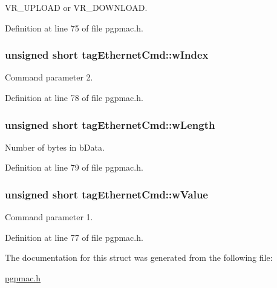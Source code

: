 V\-R\-\_\-\-U\-P\-L\-O\-A\-D or V\-R\-\_\-\-D\-O\-W\-N\-L\-O\-A\-D. 



Definition at line 75 of file pgpmac.\-h.

\hypertarget{structtagEthernetCmd_a92f5a374e87d4f496b64b4888850d6e6}{
\subsubsection[{w\-Index}]{\setlength{\rightskip}{0pt plus 5cm}unsigned short tag\-Ethernet\-Cmd\-::w\-Index}}\label{structtagEthernetCmd_a92f5a374e87d4f496b64b4888850d6e6}


Command parameter 2. 



Definition at line 78 of file pgpmac.\-h.

\hypertarget{structtagEthernetCmd_af5df25ff13ca30fa33719d0df1ab7e97}{
\subsubsection[{w\-Length}]{\setlength{\rightskip}{0pt plus 5cm}unsigned short tag\-Ethernet\-Cmd\-::w\-Length}}\label{structtagEthernetCmd_af5df25ff13ca30fa33719d0df1ab7e97}


Number of bytes in b\-Data. 



Definition at line 79 of file pgpmac.\-h.

\hypertarget{structtagEthernetCmd_aec0ee9a5f6c7e3bc6e4bd98f1bd52783}{
\subsubsection[{w\-Value}]{\setlength{\rightskip}{0pt plus 5cm}unsigned short tag\-Ethernet\-Cmd\-::w\-Value}}\label{structtagEthernetCmd_aec0ee9a5f6c7e3bc6e4bd98f1bd52783}


Command parameter 1. 



Definition at line 77 of file pgpmac.\-h.



The documentation for this struct was generated from the following file\-:\begin{DoxyCompactItemize}
\item 
\hyperlink{pgpmac_8h}{pgpmac.\-h}\end{DoxyCompactItemize}

